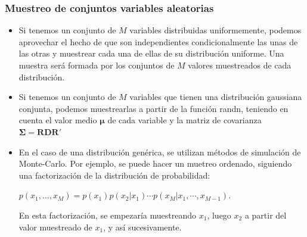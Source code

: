 \begin{frame}
\frametitle{Muestreo de conjuntos variables aleatorias}

\footnotesize
\begin{itemize}
\item Si tenemos un conjunto de $M$ variables distribuidas uniformemente, podemos aprovechar el hecho de que son independientes condicionalmente las unas de las otras y muestrear cada una de ellas de su distribución uniforme. Una muestra será formada por los conjuntos de $M$ valores muestreados de cada distribución.
\item Si tenemos un conjunto de $M$ variables que tienen una distribución gaussiana conjunta, podemos muestrearlas  a partir de la función randn, teniendo en cuenta el valor medio $\bm{\mu}$ de cada variable y la matriz de covarianza $\bm{\Sigma}=\bm{RDR}'$

\vspace{-0.4cm}



\item  En el caso de una distribución genérica, se utilizan métodos de simulación de Monte-Carlo. Por ejemplo, se puede hacer un muetreo ordenado, siguiendo una factorización de la distribución de probabilidad:

$p(x_1,\dots,x_M)=p(x_1)p(x_2|x_1)\cdots p(x_M|x_1,\cdots,x_{M-1})$.

En esta factorización, se empezaría muestreando $x_1$, luego $x_2$ a partir del valor muestreado de $x_1$, y así sucesivamente.  

\end{itemize}


\end{frame}


